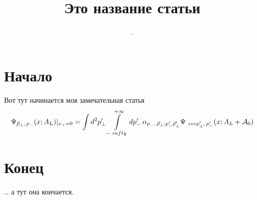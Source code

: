 \documentclass[a4paper,11pt]{article}
\author{ . }
\title {Это название статьи}
\begin{document}
	\maketitle
	\tableofcontents
	\section{Начало}
	Вот тут начинается моя замечательная статья
	\begin{equation}
		\label{eq}
		\Psi_{\vec{p}_\perp,\,p_-}(x;A_L)\vert_{x_+=0}=\int\limits d^2p_\perp'\int\limits_{-\
			infty}^{+\infty} dp_-'\,\alpha_{p_-,\,\vec{p}_\perp; p_-'\vec{p}_\perp'}\Psi_{\
			vec{p}_\perp',\,p_-'}(x;A_L+{\cal A}_0)
	\end{equation}
	\section{Конец}
	\ldots{} а тут она кончается.
\end{document}
